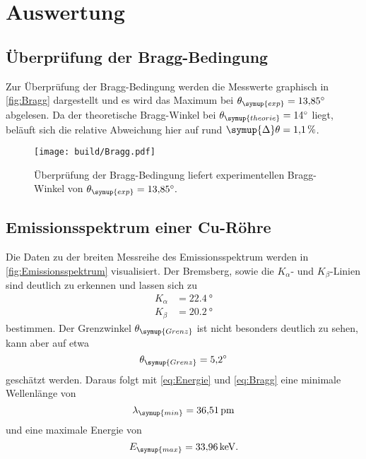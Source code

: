 \section{Auswertung}
\label{sec:Auswertung}

\subsection{Überprüfung der Bragg-Bedingung}
Zur Überprüfung der Bragg-Bedingung werden die Messwerte graphisch in \autoref{fig:Bragg} dargestellt und es wird das Maximum bei
$\theta_{\symup{exp}}=\qty{13.85}{\degree}$ abgelesen. Da der theoretische Bragg-Winkel bei $\theta_{\symup{theorie}} = \qty{14}{\degree}$
liegt, beläuft sich die relative Abweichung hier auf rund $\symup{\Delta}\theta = \qty{1,1}{\percent}$.

\begin{figure}[H]
  \centering
  \texttt{[image: build/Bragg.pdf]}
  \caption{Überprüfung der Bragg-Bedingung liefert experimentellen Bragg-Winkel von $\theta_{\symup{exp}}=\qty{13.85}{\degree}.$}
  \label{fig:Bragg}
\end{figure}

\subsection{Emissionsspektrum einer Cu-Röhre}
Die Daten zu der breiten Messreihe des Emissionsspektrum werden in \autoref{fig:Emissionsspektrum} visualisiert. Der Bremsberg, sowie die 
$K_{\alpha}$- und $K_{\beta}$-Linien sind deutlich zu erkennen und lassen sich zu
\begin{align*}
    K_{\alpha} &= \qty{22,4}{\degree} \\
    K_{\beta} &= \qty{20,2}{\degree}
\end{align*}
bestimmen. Der Grenzwinkel $\theta_{\symup{Grenz}}$ ist nicht besonders deutlich zu sehen, kann aber auf etwa
\begin{equation*}
  \theta_{\symup{Grenz}} = \qty{5,2}{\degree}
\end{equation*}
geschätzt werden. Daraus folgt mit \eqref{eq:Energie} und \eqref{eq:Bragg} eine minimale Wellenlänge von 
\begin{equation*}
  \lambda_{\symup{min}} = \qty{36.51}{\pico\metre}
\end{equation*}
und eine maximale Energie von
\begin{equation*}
  E_{\symup{max}} = \qty{33.96}{\kilo\electronvolt}.
\end{equation*}


